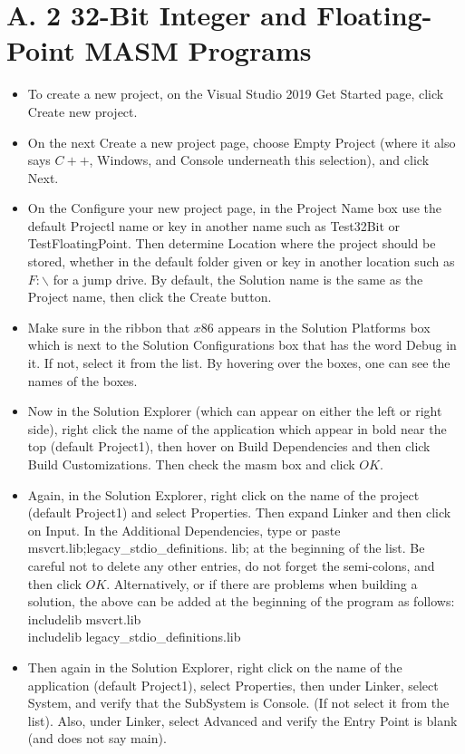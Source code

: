 \documentclass[10pt]{article}
\begin{document}
\section*{A. 2 32-Bit Integer and Floating-Point MASM Programs}
\begin{itemize}
  \item To create a new project, on the Visual Studio 2019 Get Started page, click Create new project.
  \item On the next Create a new project page, choose Empty Project (where it also says $C++$, Windows, and Console underneath this selection), and click Next.
  \item On the Configure your new project page, in the Project Name box use the default Projectl name or key in another name such as Test32Bit or TestFloatingPoint. Then determine Location where the project should be stored, whether in the default folder given or key in another location such as $F: \backslash$ for a jump drive. By default, the Solution name is the same as the Project name, then click the Create button.
  \item Make sure in the ribbon that $x 86$ appears in the Solution Platforms box which is next to the Solution Configurations box that has the word Debug in it. If not, select it from the list. By hovering over the boxes, one can see the names of the boxes.
  \item Now in the Solution Explorer (which can appear on either the left or right side), right click the name of the application which appear in bold near the top (default Project1), then hover on Build Dependencies and then click Build Customizations. Then check the masm box and click $O K$.
  \item Again, in the Solution Explorer, right click on the name of the project (default Project1) and select Properties. Then expand Linker and then click on Input. In the Additional Dependencies, type or paste msvcrt.lib;legacy\_stdio\_definitions. lib; at the beginning of the list. Be careful not to delete any other entries, do not forget the semi-colons, and then click $O K$. Alternatively, or if there are problems when building a solution, the above can be added at the beginning of the program as follows:\\
includelib msvcrt.lib\\
includelib legacy\_stdio\_definitions.lib
  \item Then again in the Solution Explorer, right click on the name of the application (default Project1), select Properties, then under Linker, select System, and verify that the SubSystem is Console. (If not select it from the list). Also, under Linker, select Advanced and verify the Entry Point is blank (and does not say main).

\end{itemize}
\end{document}
